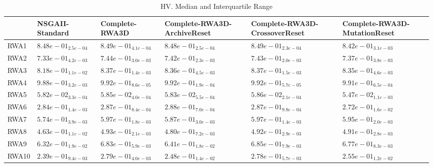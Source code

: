 \documentclass{article}
\begin{document}
\begin{table}
\caption{HV. Median and Interquartile Range}
\label{table: HV}
\centering
\begin{scriptsize}
\begin{tabular}{llllll}
\hline & NSGAII-Standard & Complete-RWA3D & Complete-RWA3D-ArchiveReset & Complete-RWA3D-CrossoverReset &  Complete-RWA3D-MutationReset\\
\hline 
RWA1 & $  8.48e-01_{ 2.5e-04}$ & \cellcolor{gray25}$  8.49e-01_{ 4.1e-04}$ & $  8.48e-01_{ 2.5e-04}$ & \cellcolor{gray95}$  8.49e-01_{ 2.3e-04}$ & $  8.42e-01_{ 3.1e-03}$ \\
RWA2 & $  7.33e-01_{ 4.2e-03}$ & \cellcolor{gray95}$  7.44e-01_{ 3.0e-03}$ & $  7.42e-01_{ 2.3e-03}$ & \cellcolor{gray25}$  7.43e-01_{ 2.0e-03}$ & $  7.37e-01_{ 3.8e-03}$ \\
RWA3 & $  8.18e-01_{ 1.1e-02}$ & \cellcolor{gray95}$  8.37e-01_{ 1.4e-03}$ & $  8.36e-01_{ 4.5e-03}$ & \cellcolor{gray25}$  8.37e-01_{ 1.5e-03}$ & $  8.35e-01_{ 4.6e-03}$ \\
RWA4 & $  9.88e-01_{ 3.2e-03}$ & \cellcolor{gray95}$  9.92e-01_{ 8.6e-05}$ & $  9.92e-01_{ 1.9e-04}$ & \cellcolor{gray25}$  9.92e-01_{ 5.7e-05}$ & $  9.91e-01_{ 6.5e-04}$ \\
RWA5 & $  5.82e-02_{ 3.3e-04}$ & \cellcolor{gray25}$  5.85e-02_{ 4.0e-04}$ & $  5.83e-02_{ 5.5e-04}$ & \cellcolor{gray95}$  5.86e-02_{ 2.1e-04}$ & $  5.47e-02_{ 1.1e-03}$ \\
RWA6 & $  2.84e-01_{ 1.4e-03}$ & \cellcolor{gray25}$  2.87e-01_{ 8.4e-04}$ & \cellcolor{gray95}$  2.88e-01_{ 7.0e-04}$ & $  2.87e-01_{ 9.8e-04}$ & $  2.72e-01_{ 1.6e-02}$ \\
RWA7 & $  5.74e-01_{ 3.9e-03}$ & \cellcolor{gray95}$  5.97e-01_{ 1.8e-03}$ & $  5.87e-01_{ 3.0e-03}$ & \cellcolor{gray25}$  5.97e-01_{ 1.4e-03}$ & $  5.95e-01_{ 2.0e-03}$ \\
RWA8 & $  4.63e-01_{ 1.1e-02}$ & \cellcolor{gray95}$  4.93e-01_{ 2.1e-03}$ & $  4.80e-01_{ 7.2e-03}$ & \cellcolor{gray25}$  4.92e-01_{ 2.9e-03}$ & $  4.91e-01_{ 2.8e-03}$ \\
RWA9 & $  6.32e-01_{ 1.9e-02}$ & \cellcolor{gray25}$  6.83e-01_{ 5.9e-03}$ & $  6.41e-01_{ 1.8e-02}$ & \cellcolor{gray95}$  6.85e-01_{ 7.9e-03}$ & $  6.77e-01_{ 8.3e-03}$ \\
RWA10 & $  2.39e-01_{ 9.4e-03}$ & \cellcolor{gray95}$  2.79e-01_{ 4.0e-03}$ & $  2.48e-01_{ 1.4e-02}$ & \cellcolor{gray25}$  2.78e-01_{ 5.7e-03}$ & $  2.55e-01_{ 1.2e-02}$ \\
\hline
\end{tabular}
\end{scriptsize}
\end{table}
\end{document}
